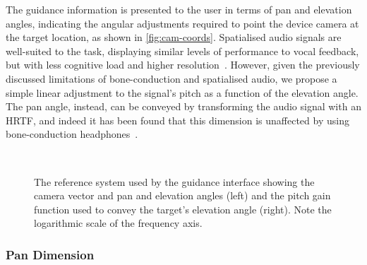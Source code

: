 \documentclass[]{interact}
\begin{document}
The guidance information is presented to the user in terms of pan and elevation angles, indicating the angular adjustments required to point the device camera at the target location, as shown in \cref{fig:cam-coords}.
Spatialised audio signals are well-suited to the task, displaying similar levels of performance to vocal feedback, but with less cognitive load and higher resolution~\citep{klatzky2006cognitive}.
However, given the previously discussed limitations of bone-conduction and spatialised audio, we propose a simple linear adjustment to the signal's pitch as a function of the elevation angle. 
The pan angle, instead, can be conveyed by transforming the audio signal with an HRTF, and indeed it has been found that this dimension is unaffected by using bone-conduction headphones~\cite{schonstein2008comparison,macdonald2006spatial,stanley2006lateralization}. 

\begin{figure}[t]
  \centering
~
  \caption{The reference system used by the guidance interface showing the camera vector and pan and elevation angles (left) and the pitch gain function used to convey the target's elevation angle (right). Note the logarithmic scale of the frequency axis.}
\end{figure}

\subsubsection{Pan Dimension}
\end{document}
